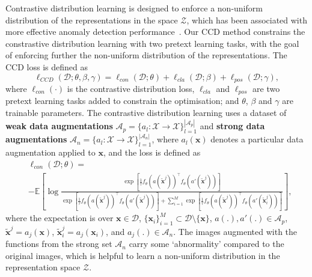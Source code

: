\documentclass[runningheads]{llncs}
\begin{document}
Contrastive distribution learning is designed to enforce a non-uniform distribution of the representations in the space $\mathcal{Z}$, 
which has been associated with more effective anomaly detection performance~\cite{sohn2020learning}.
Our CCD method constrains the constrastive distribution learning with two pretext learning tasks, with the goal of enforcing further the non-uniform distribution of the representations.
The CCD loss is defined as
\begin{equation}
    \ell_{CCD}(\mathcal{D};\theta,\beta,\gamma)=
    \ell_{con}(\mathcal{D};\theta) + 
    \ell_{cla}(\mathcal{D};\beta) + 
    \ell_{pos}(\mathcal{D};\gamma), 
    \label{eq:self_supervised_training_loss}
\end{equation}
where $\ell_{con}(\cdot)$ is the contrastive distribution loss, $\ell_{cla}$ and $\ell_{pos}$ are two pretext learning tasks added to constrain the optimisation; and $\theta$, $\beta$ and $\gamma$ are trainable parameters. The contrastive distribution learning 
uses a dataset of \textbf{weak data augmentations} $\mathcal{A}_p=\{a_l:\mathcal{X} \to \mathcal{X}\}_{l=1}^{|\mathcal{A}_p|}$ and \textbf{strong data augmentations} $\mathcal{A}_n=\{a_l:\mathcal{X} \to \mathcal{X}\}_{l=1}^{|\mathcal{A}_n|}$, where 
$a_l(\mathbf{x})$ denotes a particular data augmentation applied to $\mathbf{x}$, and the loss is defined as
\begin{equation}
\begin{split}
    &\ell_{con}(\mathcal{D};\theta)= \\
    &-\mathbb{E} 
    \left [
    \log\frac{\exp\left[ \frac{1}{\tau} f_{\theta}(a(\tilde{\mathbf{x}}^j))^{\top} f_{\theta}(a'(\tilde{\mathbf{x}}^j)) \right]}{\exp\left[ \frac{1}{\tau} f_{\theta}(a(\tilde{\mathbf{x}}^j))^{\top} f_{\theta}(a'(\tilde{\mathbf{x}}^j)) \right] + \sum_{i=1}^M \exp\left[ \frac{1}{\tau} f_{\theta}(a(\tilde{\mathbf{x}}^j))^{\top} f_{\theta}(a'(\tilde{\mathbf{x}}_i^j)) \right]}
    \right ],
\end{split}
\label{eq:contrastive_loss}
\end{equation}
where the expectation is over $\mathbf{x}\in\mathcal{D}$, 
$\{\mathbf{x}_i\}_{i=1}^M \subset \mathcal{D} \setminus \{\mathbf{x}\}$, $a(.),a'(.) \in  \mathcal{A}_p$, $\tilde{\mathbf{x}}^j=a_j(\mathbf{x})$,
$\tilde{\mathbf{x}}_i^j=a_j(\mathbf{x}_i)$, and $a_j(.)\in \mathcal{A}_n$. The images augmented with the functions from the strong set $\mathcal{A}_n$ carry some `abnormality' compared to the original images, which is helpful to learn a non-uniform distribution in the representation space $\mathcal{Z}$. 
\end{document}
